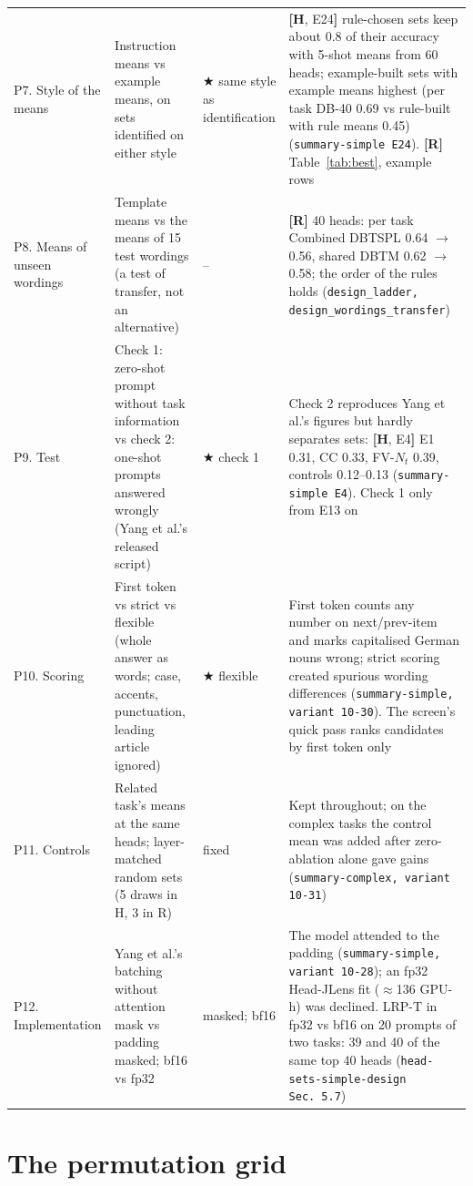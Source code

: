 \documentclass[10pt,a4paper]{article}
\newcommand{\best}{\textcolor{blue!65!black}{$\bigstar$}}
\newcommand{\yes}{\textcolor{green!45!black}{\ding{51}}}
\newcommand{\tR}{\textsf{\textbf{[R]}}}
\newcommand{\tH}[1]{\textsf{\textbf{[H}, #1\textbf{]}}}
\newcommand{\src}[1]{{\footnotesize\textcolor{gray!60!black}{(\texttt{#1})}}}
\begin{document}
\begin{xltabular}{\textwidth}{@{}>{\raggedright\arraybackslash}p{2.35cm}>{\hsize}L>{\raggedright\arraybackslash}p{2.45cm}>{\hsize}L@{}}
P7. Style of the means & Instruction means vs example means, on sets identified on either style & \best{} same style as identification & \tH{E24} rule-chosen sets keep about 0.8 of their accuracy with 5-shot means from 60 heads; example-built sets with example means highest (per task DB-40 0.69 vs rule-built with rule means 0.45) \src{summary-simple E24}. \tR{} Table~\ref{tab:best}, example rows \\
P8. Means of unseen wordings & Template means vs the means of 15 test wordings (a test of transfer, not an alternative) & -- & \tR{} 40 heads: per task Combined DBTSPL 0.64 $\to$ 0.56, shared DBTM 0.62 $\to$ 0.58; the order of the rules holds \src{design\_ladder, design\_wordings\_transfer} \\
P9. Test & Check 1: zero-shot prompt without task information vs check 2: one-shot prompts answered wrongly (Yang et al.'s released script) & \best{} check 1 & Check 2 reproduces Yang et al.'s figures but hardly separates sets: \tH{E4} E1 0.31, CC 0.33, FV-$N_t$ 0.39, controls 0.12--0.13 \src{summary-simple E4}. Check 1 only from E13 on \\
P10. Scoring & First token vs strict vs flexible (whole answer as words; case, accents, punctuation, leading article ignored) & \best{} flexible & First token counts any number on next/prev-item and marks capitalised German nouns wrong; strict scoring created spurious wording differences \src{summary-simple, variant 10-30}. The screen's quick pass ranks candidates by first token only \\
P11. Controls & Related task's means at the same heads; layer-matched random sets (5 draws in H, 3 in R) & fixed & Kept throughout; on the complex tasks the control mean was added after zero-ablation alone gave gains \src{summary-complex, variant 10-31} \\
P12. Implementation & Yang et al.'s batching without attention mask vs padding masked; bf16 vs fp32 & \yes{} masked; bf16 & The model attended to the padding \src{summary-simple, variant 10-28}; an fp32 Head-JLens fit ($\approx$136 GPU-h) was declined. LRP-T in fp32 vs bf16 on 20 prompts of two tasks: 39 and 40 of the same top 40 heads \src{head-sets-simple-design Sec.~5.7} \\
\end{xltabular}
\normalsize

\section{The permutation grid}\label{sec:grid}
\end{document}
